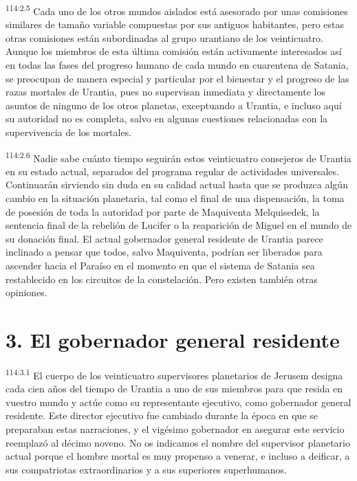 \par
\textsuperscript{114:2.5} Cada uno de los otros mundos aislados está asesorado por unas comisiones similares de tamaño variable compuestas por sus antiguos habitantes, pero estas otras comisiones están subordinadas al grupo urantiano de los veinticuatro. Aunque los miembros de esta última comisión están activamente interesados así en todas las fases del progreso humano de cada mundo en cuarentena de Satania, se preocupan de manera especial y particular por el bienestar y el progreso de las razas mortales de Urantia, pues no supervisan inmediata y directamente los asuntos de ninguno de los otros planetas, exceptuando a Urantia, e incluso aquí su autoridad no es completa, salvo en algunas cuestiones relacionadas con la supervivencia de los mortales.

\par
\textsuperscript{114:2.6} Nadie sabe cuánto tiempo seguirán estos veinticuatro consejeros de Urantia en su estado actual, separados del programa regular de actividades universales. Continuarán sirviendo sin duda en su calidad actual hasta que se produzca algún cambio en la situación planetaria, tal como el final de una dispensación, la toma de posesión de toda la autoridad por parte de Maquiventa Melquisedek, la sentencia final de la rebelión de Lucifer o la reaparición de Miguel en el mundo de su donación final. El actual gobernador general residente de Urantia parece inclinado a pensar que todos, salvo Maquiventa, podrían ser liberados para ascender hacia el Paraíso en el momento en que el sistema de Satania sea restablecido en los circuitos de la constelación. Pero existen también otras opiniones.

\section*{3. El gobernador general residente}
\par
\textsuperscript{114:3.1} El cuerpo de los veinticuatro supervisores planetarios de Jerusem designa cada cien años del tiempo de Urantia a uno de sus miembros para que resida en vuestro mundo y actúe como su representante ejecutivo, como gobernador general residente. Este director ejecutivo fue cambiado durante la época en que se preparaban estas narraciones, y el vigésimo gobernador en asegurar este servicio reemplazó al décimo noveno. No os indicamos el nombre del supervisor planetario actual porque el hombre mortal es muy propenso a venerar, e incluso a deificar, a sus compatriotas extraordinarios y a sus superiores superhumanos.

